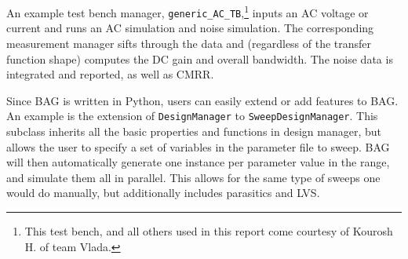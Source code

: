 \clearpage
An example test bench manager, \texttt{generic\_AC\_TB},\footnote{This test bench, and all others used in this report come courtesy of Kourosh H. of team Vlada.} inputs an AC voltage or current and runs an AC simulation and noise simulation. The corresponding measurement manager sifts through the data and (regardless of the transfer function shape) computes the DC gain and overall bandwidth. The noise data is integrated and reported, as well as CMRR. 

Since BAG is written in Python, users can easily extend or add features to BAG. An example is the extension of \texttt{DesignManager} to \texttt{SweepDesignManager}. This subclass inherits all the basic properties and functions in design manager, but allows the user to specify a set of variables in the parameter file to sweep. BAG will then automatically generate one instance per parameter value in the range, and simulate them all in parallel. This allows for the same type of sweeps one would do manually, but additionally includes parasitics and LVS.